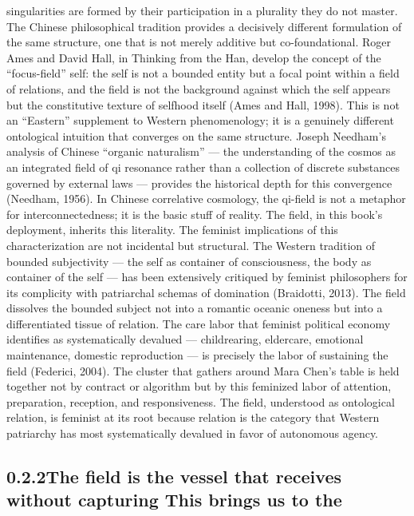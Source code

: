 singularities are formed by their participation in a plurality they do not master. The Chinese philosophical tradition provides a decisively different formulation of the same structure, one that is not merely additive but co-foundational. Roger Ames and David Hall, in Thinking from the Han, develop the concept of the “focus-field” self: the self is not a bounded entity but a focal point within a field of relations, and the field is not the background against which the self appears but the constitutive texture of selfhood itself (Ames and Hall, 1998). This is not an “Eastern” supplement to Western phenomenology; it is a genuinely different ontological intuition that converges on the same structure. Joseph Needham’s analysis of Chinese “organic naturalism” — the understanding of the cosmos as an integrated field of qi resonance rather than a collection of discrete substances governed by external laws — provides the historical depth for this convergence (Needham, 1956). In Chinese correlative cosmology, the qi-field is not a metaphor for interconnectedness; it is the basic stuff of reality. The field, in this book’s deployment, inherits this literality. The feminist implications of this characterization are not incidental but structural. The Western tradition of bounded subjectivity — the self as container of consciousness, the body as container of the self — has been extensively critiqued by feminist philosophers for its complicity with patriarchal schemas of domination (Braidotti, 2013). The field dissolves the bounded subject not into a romantic oceanic oneness but into a differentiated tissue of relation. The care labor that feminist political economy identifies as systematically devalued — childrearing, eldercare, emotional maintenance, domestic reproduction — is precisely the labor of sustaining the field (Federici, 2004). The cluster that gathers around Mara Chen’s table is held together not by contract or algorithm but by this feminized labor of attention, preparation, reception, and responsiveness. The field, understood as ontological relation, is feminist at its root because relation is the category that Western patriarchy has most systematically devalued in favor of autonomous agency.

\subsection{0.2.2\quad The field is the vessel that receives without capturing This brings us to the}

